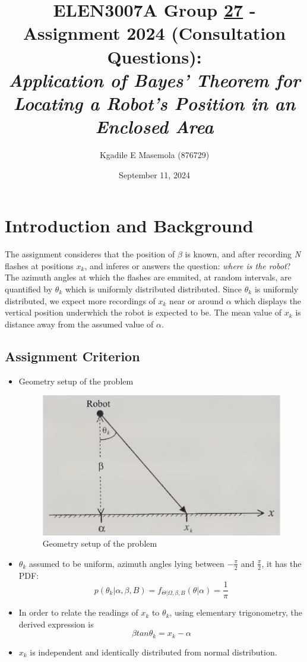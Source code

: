 \documentclass[a4paper,11pt]{article}
\title{ELEN3007A Group \underline{27} - Assignment 2024 (Consultation Questions): \\ 
\large \emph{Application of Bayes’ Theorem for Locating a Robot’s
Position in an Enclosed Area}}
\author{Kgadile E Masemola (876729)}
\date{September 11, 2024}
\begin{document}
\maketitle

\section*{Introduction and Background}
The assignment consideres that the position of $\beta$ is known, and after recording \emph{N} flashes at positions $x_k$, and inferes or answers the question: \emph{where is the robot}?\\
The azimuth angles at which the flashes are emmited, at random intervals, are quantified by $\theta_k$ which is uniformly distributed distributed. Since $\theta_k$ is uniformly distributed, we expect more recordings of $x_k$ near or around $\alpha$ which displays the vertical position underwhich the robot is expected to be. The mean value of $x_k$ is distance away from the assumed value of $\alpha$.

\subsection*{Assignment Criterion}
\begin{itemize}
	\item Geometry setup of the problem
		\begin{figure}[h]
        		\centering
        		\includegraphics[scale=0.5]{elen3007assignfig.png} 
        		\caption{Geometry setup of the problem}
        \end{figure}
	\item $\theta_k$ assumed to be uniform, azimuth angles lying between $-\frac{\pi}{2}$ and $\frac{\pi}{2}$, it has the PDF:
		\begin{equation}
			p(\theta_k | \alpha, \beta, B) = f_{\Theta | \Omega, \beta, B}( \theta |\alpha) = \frac{1}{\pi}
		\end{equation}
	\item In order to relate the readings of $x_k$ to $\theta_k$, using elementary trigonometry, the derived expression is
		\begin{equation}
			\beta tan \theta_k = x_k - \alpha
		\end{equation}
	\item $x_k$ is independent and identically distributed from normal distribution.
\end{itemize}
\end{document}
